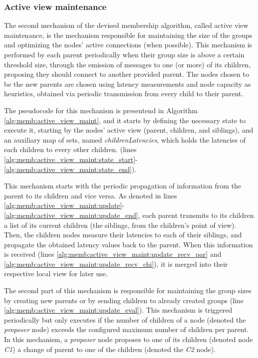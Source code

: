 \subsubsection{Active view maintenance} \label{sec:overlay_network:active_view_maint}

The second mechanism of the devised membership algorithm, called active view maintenance, is the mechanism responsible for maintaining the size of the groups and optimizing the nodes' active connections (when possible). This mechanism is performed by each parent periodically when their group size is above a certain threshold size, through the emission of messages to one (or more) of its children, proposing they should connect to another provided parent. The nodes chosen to be the new parents are chosen using latency measurements and node capacity as heuristics, obtained via periodic transmission from every child to their parent. 

The pseudocode for this mechanism is presentend in Algorithm \ref{alg:memb:active_view_maint}, and it starts by defining the necessary state to execute it, starting by the nodes' active view (parent, children, and siblings), and an auxiliary map of sets, named \textit{childrenLatencies}, which holds the latencies of each children to every other children. (lines \ref{alg:memb:active_view_maint:state_start}-\ref{alg:memb:active_view_maint:state_end}). 



This mechanism starts with the periodic propagation of information from the parent to its children and vice versa. As denoted in lines \ref{alg:memb:active_view_maint:update}-\ref{alg:memb:active_view_maint:update_end}, each parent transmits to its children a list of its current children (the siblings, from the children's point of view). Then, the children nodes measure their latencies to each of their siblings, and propagate the obtained latency values back to the parent. When this information is received (lines \ref{alg:memb:active_view_maint:update_recv_par} and \ref{alg:memb:active_view_maint:update_recv_chi}), it is merged into their respective local view for later use.

The second part of this mechanism is responsible for maintaining the group sizes by creating new parents or by sending children to already created groups (line \ref{alg:memb:active_view_maint:update_eval}). This mechanism is triggered periodically but only executes if the number of children of a  node (denoted the \textit{proposer} node) exceeds the configured maximum number of children per parent. In this mechanism, a \textit{proposer} node proposes to one of its children (denoted node \textit{C1}) a change of parent to one of the  children (denoted the \textit{C2} node).


